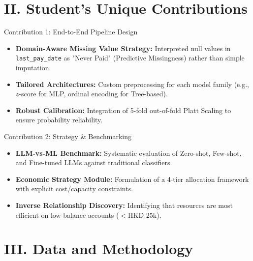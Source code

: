 \documentclass[10pt]{beamer}
\begin{document}
\section{II. Student's Unique Contributions}

\begin{frame}{\textrm{Contribution 1: End-to-End Pipeline Design}}
    \begin{itemize}
        \item \textbf{Domain-Aware Missing Value Strategy:} Interpreted null values in \texttt{last\_pay\_date} as "Never Paid" (Predictive Missingness) rather than simple imputation.
        \item \textbf{Tailored Architectures:} Custom preprocessing for each model family (e.g., $z$-score for MLP, ordinal encoding for Tree-based).
        \item \textbf{Robust Calibration:} Integration of 5-fold out-of-fold Platt Scaling to ensure probability reliability.
    \end{itemize}
\end{frame}

\begin{frame}{\textrm{Contribution 2: Strategy \& Benchmarking}}
    \begin{itemize}
        \item \textbf{LLM-vs-ML Benchmark:} Systematic evaluation of Zero-shot, Few-shot, and Fine-tuned LLMs against traditional classifiers.
        \item \textbf{Economic Strategy Module:} Formulation of a 4-tier allocation framework with explicit cost/capacity constraints.
        \item \textbf{Inverse Relationship Discovery:} Identifying that resources are most efficient on low-balance accounts ($<$HKD 25k).
    \end{itemize}
\end{frame}

\section{III. Data and Methodology}
\end{document}
